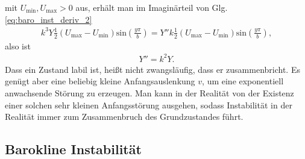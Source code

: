 \documentclass{book}
\renewcommand{\sin}{\text{sin}}
\begin{document}
%
mit $U_{\text{min}}, U_{\text{max}}>0$ aus, erhält man im Imaginärteil von Glg. \eqref{eq:baro_inst_deriv_2}
%
\begin{eqnarray}
k^3Y\frac{1}{2}\left(U_{\text{max}} - U_{\text{min}}\right)\sin\left(\frac{y\pi}{b}\right) = Y''k\frac{1}{2}\left(U_{\text{max}} - U_{\text{min}}\right)\sin\left(\frac{y\pi}{b}\right), 
\end{eqnarray}
%
also ist
%
\begin{eqnarray}
Y'' = k^2Y.
\end{eqnarray}
%
Dass ein Zustand labil ist, heißt nicht zwangsläufig, dass er zusammenbricht. Es genügt aber eine beliebig kleine Anfangsauslenkung $v$, um eine exponentiell anwachsende Störung zu erzeugen. Man kann in der Realität von der Existenz einer solchen sehr kleinen Anfangsstörung ausgehen, sodass Instabilität in der Realität immer zum Zusammenbruch des Grundzustandes führt.

\subsection{Barokline Instabilität}
\label{sec:barokline_instabilitaet}
\end{document}
